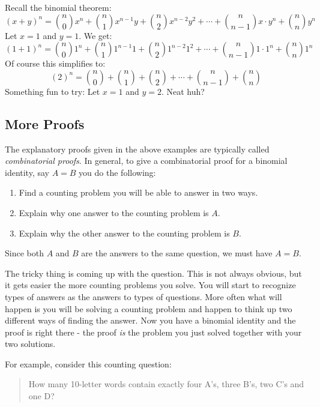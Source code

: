 \documentclass[12pt]{article}
\begin{document}
Recall the binomial theorem:
\[(x + y)^n = {n \choose 0}x^n + {n \choose 1}x^{n-1}y + {n \choose 2}x^{n-2}y^2 + \cdots + {n \choose n-1}x\cdot y^n + {n \choose n}y^n\]
Let $x = 1$ and $y = 1$.  We get:
\[(1 + 1)^n = {n \choose 0}1^n + {n \choose 1}1^{n-1}1 + {n \choose 2}1^{n-2}1^2 + \cdots + {n \choose n-1}1\cdot 1^n + {n \choose n}1^n\]
Of course this simplifies to:
\[(2)^n = {n \choose 0} + {n \choose 1} + {n \choose 2} + \cdots + {n \choose n-1} + {n \choose n}\]
Something fun to try: Let $x = 1$ and $y = 2$.  Neat huh?

\subsection{More Proofs}

The explanatory proofs given in the above examples are typically called {\em combinatorial proofs}.  In general, to give a combinatorial proof for a binomial identity, say $A = B$ you do the following:
\begin{enumerate}
  \item Find a counting problem you will be able to answer in two ways.
  \item Explain why one answer to the counting problem is $A$.
  \item Explain why the other answer to the counting problem is $B$.
\end{enumerate}

Since both $A$ and $B$ are the answers to the same question, we must have $A = B$.  

The tricky thing is coming up with the question.  This is not always obvious, but it gets easier the more counting problems you solve.  You will start to recognize types of answers as the answers to types of questions.  More often what will happen is you will be solving a counting problem and happen to think up two different ways of finding the answer.  Now you have a binomial identity and the proof is right there - the proof {\em is} the problem you just solved together with your two solutions.

For example, consider this counting question:

\begin{quote}
  How many 10-letter words contain exactly four A's, three B's, two C's and one D?
\end{quote}
\end{document}
